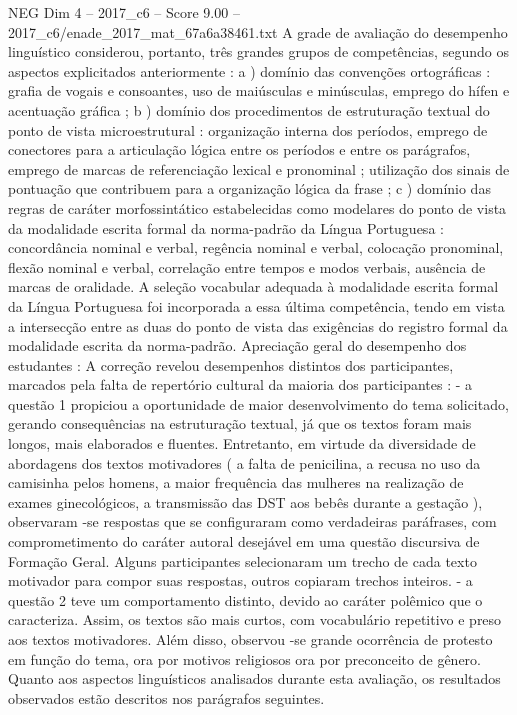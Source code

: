 \begin{textsample}{NEG Dim 4 – 2017\_c6 – Score 9.00 – 2017\_c6/enade\_2017\_mat\_67a6a38461.txt}
A grade de avaliação do desempenho linguístico considerou, portanto, três grandes grupos de competências, segundo os aspectos explicitados anteriormente : a ) domínio das convenções ortográficas : grafia de vogais e consoantes, uso de maiúsculas e minúsculas, emprego do hífen e acentuação gráfica ; b ) domínio dos procedimentos de estruturação textual do ponto de vista microestrutural : organização interna dos períodos, emprego de conectores para a articulação lógica entre os períodos e entre os parágrafos, emprego de marcas de referenciação lexical e pronominal ; utilização dos sinais de pontuação que contribuem para a organização lógica da frase ; c ) domínio das regras de caráter morfossintático estabelecidas como modelares do ponto de vista da modalidade escrita formal da norma-padrão da Língua Portuguesa : concordância nominal e verbal, regência nominal e verbal, colocação pronominal, flexão nominal e verbal, correlação entre tempos e modos verbais, ausência de marcas de oralidade.
A seleção vocabular adequada à modalidade escrita formal da Língua Portuguesa foi incorporada a essa última competência, tendo em vista a intersecção entre as duas do ponto de vista das exigências do registro formal da modalidade escrita da norma-padrão.
Apreciação geral do desempenho dos estudantes : A correção revelou desempenhos distintos dos participantes, marcados pela falta de repertório cultural da maioria dos participantes : - a questão 1 propiciou a oportunidade de maior desenvolvimento do tema solicitado, gerando consequências na estruturação textual, já que os textos foram mais longos, mais elaborados e fluentes.
Entretanto, em virtude da diversidade de abordagens dos textos motivadores ( a falta de penicilina, a recusa no uso da camisinha pelos homens, a maior frequência das mulheres na realização de exames ginecológicos, a transmissão das DST aos bebês durante a gestação ), observaram -se respostas que se configuraram como verdadeiras paráfrases, com comprometimento do caráter autoral desejável em uma questão discursiva de Formação Geral.
Alguns participantes selecionaram um trecho de cada texto motivador para compor suas respostas, outros copiaram trechos inteiros. - a questão 2 teve um comportamento distinto, devido ao caráter polêmico que o caracteriza.
Assim, os textos são mais curtos, com vocabulário repetitivo e preso aos textos motivadores.
Além disso, observou -se grande ocorrência de protesto em função do tema, ora por motivos religiosos ora por preconceito de gênero.
Quanto aos aspectos linguísticos analisados durante esta avaliação, os resultados observados estão descritos nos parágrafos seguintes.

\end{textsample}
